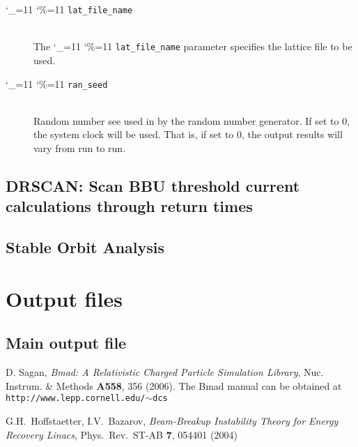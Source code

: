 \documentclass[11pt]{article}
\newcommand\ttcmd{\begingroup\catcode`\_=11 \catcode`\%=11 \dottcmd}
\newcommand\dottcmd[1]{\texttt{#1}\endgroup}
\newcommand{\vn}{\ttcmd}
\newcommand{\Newline}{\hfil \\}
\begin{document}
  \begin{description}
  \item[\vn{lat_file_name}] \Newline
The \vn{lat_file_name} parameter specifies the lattice file to be used.
  \item[\vn{ran_seed}] \Newline
Random number see used in by the random number generator. If set to 0, the system clock
will be used. That is, if set to 0, the output results will vary from run to run. 

\end{description}

\subsection{DRSCAN: Scan BBU threshold current calculations through return times} 

\subsection{Stable Orbit Analysis} 

\section{Output files} 

\subsection{Main output file}

\begin{thebibliography}{9}


D. Sagan, {\em Bmad: A Relativistic Charged Particle Simulation Library},
Nuc. Instrum. \& Methods {\bf A558}, 356 (2006).
The Bmad manual can be obtained at {\tt http://www.lepp.cornell.edu/{$\sim$}dcs}

 G.H.~Hoffstaetter, I.V.~Bazarov, \emph{
Beam-Breakup Instability Theory for Energy Recovery Linacs},
Phys.~Rev.~ST-AB {\bf 7}, 054401 (2004)

\end{thebibliography}
\end{document}
